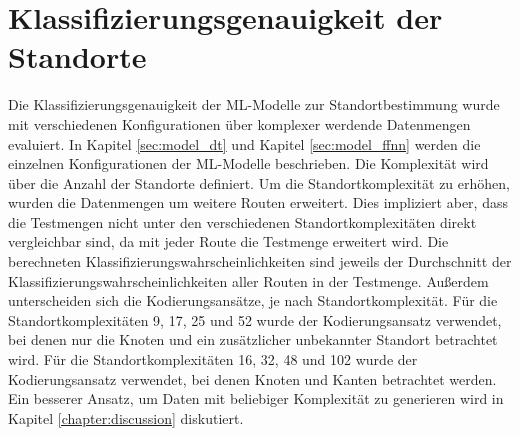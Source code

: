 \section{Klassifizierungsgenauigkeit der Standorte}
Die Klassifizierungsgenauigkeit der ML-Modelle zur Standortbestimmung wurde mit verschiedenen Konfigurationen über komplexer werdende Datenmengen evaluiert.
In Kapitel \ref{sec:model_dt} und Kapitel \ref{sec:model_ffnn} werden die einzelnen Konfigurationen der ML-Modelle beschrieben.
Die Komplexität wird über die Anzahl der Standorte definiert.
Um die Standortkomplexität zu erhöhen, wurden die Datenmengen um weitere Routen erweitert.
Dies impliziert aber, dass die Testmengen nicht unter den verschiedenen Standortkomplexitäten direkt vergleichbar sind, da mit jeder Route die Testmenge erweitert wird.
Die berechneten Klassifizierungswahrscheinlichkeiten sind jeweils der Durchschnitt der Klassifizierungswahrscheinlichkeiten aller Routen in der Testmenge.
\newline
\newline
Außerdem unterscheiden sich die Kodierungsansätze, je nach Standortkomplexität.
Für die Standortkomplexitäten 9, 17, 25 und 52 wurde der Kodierungsansatz verwendet, bei denen nur die Knoten und ein zusätzlicher unbekannter Standort betrachtet wird.
Für die Standortkomplexitäten 16, 32, 48 und 102 wurde der Kodierungsansatz verwendet, bei denen Knoten und Kanten betrachtet werden.
Ein besserer Ansatz, um Daten mit beliebiger Komplexität zu generieren wird in Kapitel \ref{chapter:discussion} diskutiert.

